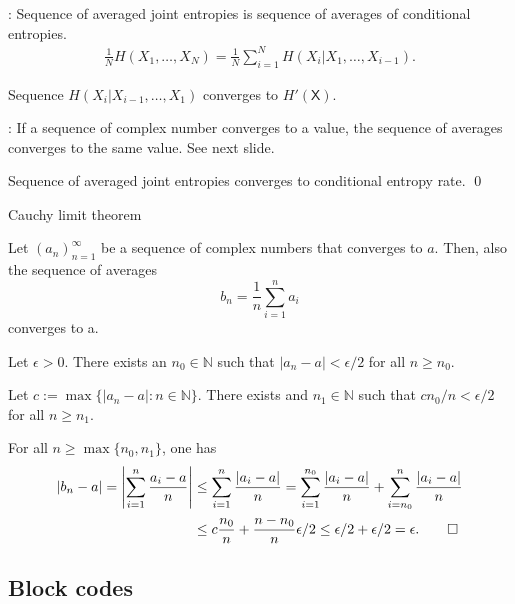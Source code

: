 \begin{frame}
\bit
\item {}: Sequence of averaged joint entropies is sequence of averages of conditional entropies.
\begin{align*}
\frac{1}{N}H(X_1,\dots,X_N)=\frac{1}{N}\sum_{i=1}^NH(X_i|X_{1},\dots,X_{i-1}).
\end{align*}
\item {} Sequence $H(X_i|X_{i-1},\dots,X_1)$ converges to $H'(\mathsf{X})$.  
\item {}: If a sequence of complex number converges to a value, the sequence of averages converges to the same value. See next slide.
\item [\iarrow] Sequence of averaged joint entropies converges to conditional entropy rate. 
\qed
\eit
\end{frame}



\begin{frame}{Cauchy limit theorem}
\begin{lemma}
Let $(a_n)_{n=1}^{\infty}$ be a sequence of complex numbers that converges to $a$. Then, also the sequence of averages 
\[
b_n=\frac{1}{n}\sum_{i=1}^na_i
\]
converges to a. 
\end{lemma}
 Let $\epsilon>0$. There exists an $n_0\in\mathbb{N}$ such that $|a_n-a|<\epsilon/2$ for all $n\geq n_0$.
\bit
\item Let $c:=\max\{|a_n-a|\colon n\in\mathbb{N}\}$. There exists and $n_1\in\mathbb{N}$ such that $cn_0/n<\epsilon/2$ for all $n\geq n_1$.
 \item[\iarrow] For all $n\geq \max\{n_0,n_1\}$, one has 
\begin{align*}
|b_n-a|=\left|\sum_{i=1}^n\frac{a_i-a}{n}\right|&\leq \sum_{i=1}^n\frac{|a_i-a|}{n}=
\sum_{i=1}^{n_0}\frac{|a_i-a|}{n}+\sum_{i=n_0}^n\frac{|a_i-a|}{n}
 \\ &\leq c\frac{n_0}{n}+\frac{n-n_0}{n}\epsilon/2 \leq \epsilon/2+\epsilon/2=\epsilon. \qed
\end{align*}
\eit 
\end{frame}


\subsection{Block codes}

